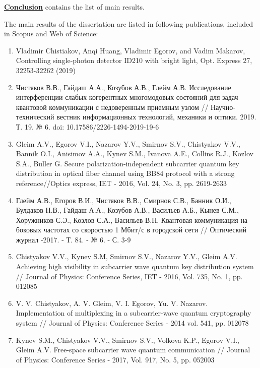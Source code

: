  \underline{\textbf{Conclusion}} contains the list of main results. 

  


{The main results of the dissertation are listed in following publications, included in Scopus and Web of Science:}
\begin{enumerate}\addtolength{\itemsep}{-0.5\baselineskip}
\renewcommand{\labelenumi}{[\theenumi]}
\item Vladimir Chistiakov, Anqi Huang, Vladimir Egorov, and Vadim Makarov, Controlling single-photon detector ID210 with bright light, Opt. Express 27, 32253-32262 (2019)
\\
\item Чистяков В.В., Гайдаш А.А., Козубов А.В., Глейм А.В. Исследование интерференции слабых когерентных многомодовых состояний для задач квантовой коммуникации с недоверенным приемным узлом // Научно-технический вестник информационных технологий, механики и оптики. 2019. Т. 19. № 6. doi: 10.17586/2226-1494-2019-19-6
\\
\item    Gleim A.V., Egorov V.I., Nazarov Y.V., Smirnov S.V., Chistyakov V.V., Bannik O.I., Anisimov A.A., Kynev S.M., Ivanova A.E., Collins R.J., Kozlov S.A., Buller G. Secure polarization-independent subcarrier quantum key distribution in optical fiber channel using BB84 protocol with a strong reference//Optics express, IET - 2016, Vol. 24, No. 3, pp. 2619-2633
\\
\item  Глейм А.В., Егоров В.И., Чистяков В.В., Смирнов С.В., Банник О.И., Булдаков Н.В., Гайдаш А.А., Козубов А.В., Васильев А.Б., Кынев С.М., Хоружников С.Э., Козлов С.А., Васильев В.Н. Квантовая коммуникация на боковых частотах со скоростью 1 Мбит/с в городской сети // Оптический журнал -2017. - Т. 84. - № 6. - С. 3-9
\\
\item  Chistyakov V.V., Kynev S.M, Smirnov S.V., Nazarov Y.V., Gleim A.V. Achieving high visibility in subcarrier wave quantum key distribution system // Journal of Physics: Conference Series, IET - 2016, Vol. 735, No. 1, pp. 012085
\\
\item V. V. Chistyakov, A. V. Gleim, V. I. Egorov, Yu. V. Nazarov. Implementation of multiplexing in a subcarrier-wave quantum cryptography system // Journal of Physics: Conference Series - 2014  vol. 541,  pp. 012078
\\
\item   Kynev S.M., Chistyakov V.V., Smirnov S.V., Volkova K.P., Egorov V.I., Gleim A.V. Free-space subcarrier wave quantum communication // Journal of Physics: Conference Series - 2017, Vol. 917, No. 5, pp. 052003
\\


\end{enumerate}
